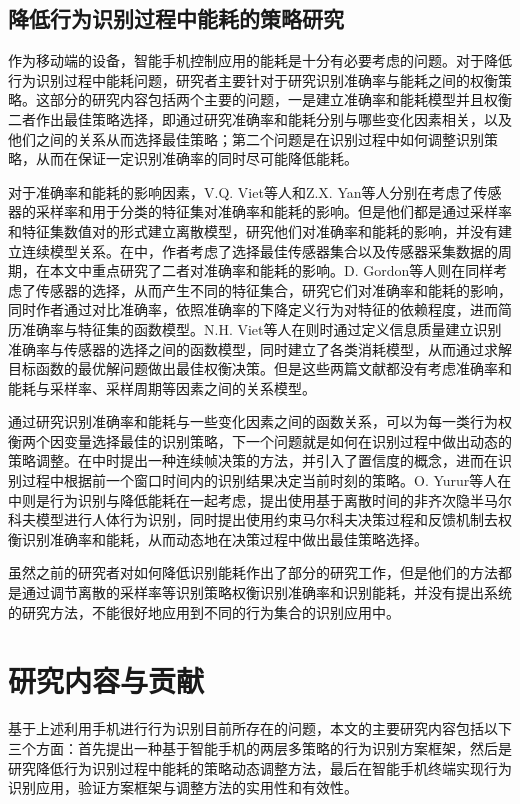 \subsection{降低行为识别过程中能耗的策略研究}
\par 作为移动端的设备，智能手机控制应用的能耗是十分有必要考虑的问题。对于降低行为识别过程中能耗问题，研究者主要针对于研究识别准确率与能耗之间的权衡策略。这部分的研究内容包括两个主要的问题，一是建立准确率和能耗模型并且权衡二者作出最佳策略选择，即通过研究准确率和能耗分别与哪些变化因素相关，以及他们之间的关系从而选择最佳策略；第二个问题是在识别过程中如何调整识别策略，从而在保证一定识别准确率的同时尽可能降低能耗\cite{zappi2008activity}。
\par 对于准确率和能耗的影响因素，V.Q. Viet等人和Z.X. Yan等人分别在\cite{fixPositionandOrientation2}\cite{modelVarialb}考虑了传感器的采样率和用于分类的特征集对准确率和能耗的影响。但是他们都是通过采样率和特征集数值对的形式建立离散模型，研究他们对准确率和能耗的影响，并没有建立连续模型关系。在\cite{sensorSet}中，作者考虑了选择最佳传感器集合以及传感器采集数据的周期，在本文中重点研究了二者对准确率和能耗的影响。D. Gordon等人则在\cite{sensorSetAndmodel}同样考虑了传感器的选择，从而产生不同的特征集合，研究它们对准确率和能耗的影响，同时作者通过对比准确率，依照准确率的下降定义行为对特征的依赖程度，进而简历准确率与特征集的函数模型。N.H. Viet等人在\cite{precionModel}则时通过定义信息质量建立识别准确率与传感器的选择之间的函数模型，同时建立了各类消耗模型，从而通过求解目标函数的最优解问题做出最佳权衡决策。但是这些两篇文献都没有考虑准确率和能耗与采样率、采样周期等因素之间的关系模型。
\par 通过研究识别准确率和能耗与一些变化因素之间的函数关系，可以为每一类行为权衡两个因变量选择最佳的识别策略，下一个问题就是如何在识别过程中做出动态的策略调整。在\cite{fixPositionandOrientation2}\cite{modelVarialb}中时提出一种连续帧决策的方法，并引入了置信度的概念，进而在识别过程中根据前一个窗口时间内的识别结果决定当前时刻的策略。O. Yurur等人在\cite{adapteStratery}中则是行为识别与降低能耗在一起考虑，提出使用基于离散时间的非齐次隐半马尔科夫模型进行人体行为识别，同时提出使用约束马尔科夫决策过程和反馈机制去权衡识别准确率和能耗，从而动态地在决策过程中做出最佳策略选择。
\par 虽然之前的研究者对如何降低识别能耗作出了部分的研究工作，但是他们的方法都是通过调节离散的采样率等识别策略权衡识别准确率和识别能耗，并没有提出系统的研究方法，不能很好地应用到不同的行为集合的识别应用中。
\section{研究内容与贡献}
\par 基于上述利用手机进行行为识别目前所存在的问题，本文的主要研究内容包括以下三个方面：首先提出一种基于智能手机的两层多策略的行为识别方案框架，然后是研究降低行为识别过程中能耗的策略动态调整方法，最后在智能手机终端实现行为识别应用，验证方案框架与调整方法的实用性和有效性。

